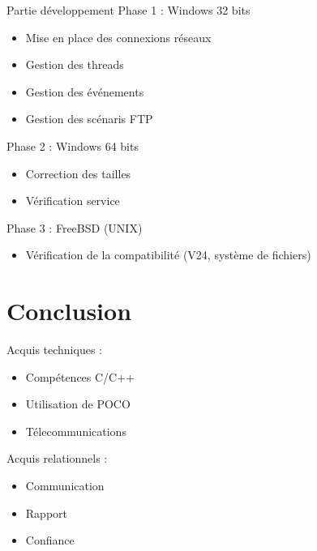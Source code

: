 \documentclass{beamer}
\begin{document}
\begin{frame}{Partie d\'eveloppement}
Phase 1 : Windows 32 bits\pause
\begin{itemize}
\item Mise en place des connexions réseaux\pause
\item Gestion des threads\pause
\item Gestion des \'ev\'enements\pause
\item Gestion des scénaris FTP\pause
\end{itemize}
Phase 2 : Windows 64 bits\pause
\begin{itemize}
\item Correction des tailles\pause
\item Vérification service\pause
\end{itemize}
Phase 3 : FreeBSD (UNIX)\pause
\begin{itemize}
\item V\'erification de la compatibilité (V24, syst\`eme de fichiers)
\end{itemize}
\end{frame}
\section{Conclusion}
\begin{frame}
Acquis techniques :\pause
\begin{itemize}
\item Compétences C/C++\pause
\item Utilisation de POCO\pause
\item T\'elecommunications\pause
\end{itemize}
\vfill
Acquis relationnels :\pause
\begin{itemize}
\item Communication\pause
\item Rapport\pause
\item Confiance
\end{itemize}
\end{frame}
\begin{frame}
\maketitle
\end{frame}
\end{document}
